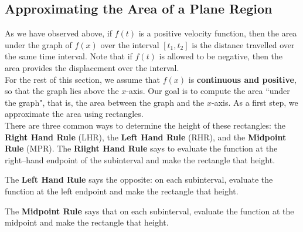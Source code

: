 \subsection{Approximating the Area of a Plane Region}
As we have observed above, if $ f(t) $ is a positive velocity function, then the area under the graph of $ f(x) $ over the interval $ [t_1,t_2] $ is the distance travelled over the same time interval.  Note that if $ f(t) $ is allowed to be negative, then the area provides the displacement over the interval.\\  









For the rest of this section, we assume that $f(x)$ is {\bf{continuous and positive}}, so that the graph lies above the $x$-axis. Our goal is to compute the area ``under the graph", that is, the area between the graph and the $x$-axis.  As a first step, we approximate the area using rectangles.\\

There are three common ways to determine the height of these rectangles: the \textbf{Right Hand Rule} (LHR), the \textbf{Left Hand Rule} (RHR), and the \textbf{Midpoint Rule} (MPR). The \textbf{Riight Hand Rule} says to evaluate the function at the right--hand endpoint of the subinterval and make the rectangle that height. 

The \textbf{Left Hand Rule} says the opposite: on each subinterval, evaluate the function at the left endpoint and make the rectangle that height. 

The \textbf{Midpoint Rule} says that on each subinterval, evaluate the function at the midpoint and make the rectangle that height. 


